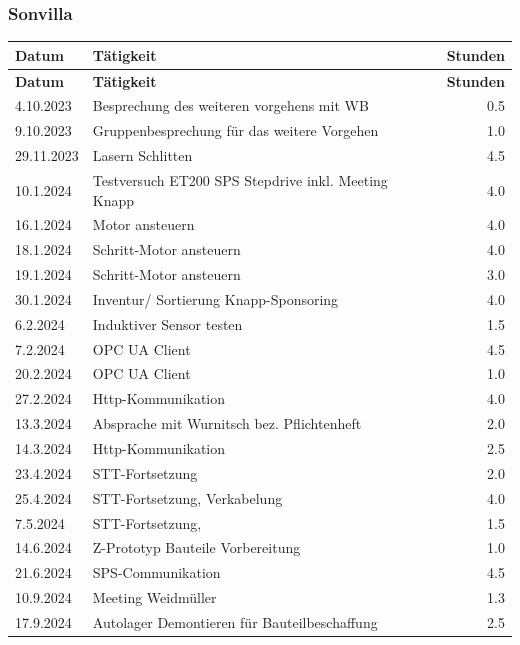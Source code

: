 \subsubsection{Sonvilla}
\begin{longtable}{|l|p{10cm}|r|}
    \hline
    \textbf{Datum} & \textbf{Tätigkeit} & \textbf{Stunden} \\
    \hline
    \endfirsthead

    \hline
    \textbf{Datum} & \textbf{Tätigkeit} & \textbf{Stunden} \\
    \hline
    \endhead

    \hline
    \endfoot

    \hline
    \endlastfoot

    4.10.2023	&	Besprechung des weiteren vorgehens mit WB	&	0.5 \\
    9.10.2023	&	Gruppenbesprechung für das weitere Vorgehen	&	1.0 \\
    29.11.2023	&	Lasern Schlitten	&	4.5 \\
    10.1.2024	&	Testversuch ET200 SPS Stepdrive inkl. Meeting Knapp	&	4.0 \\
    16.1.2024	&	Motor ansteuern	&	4.0 \\
    18.1.2024	&	Schritt-Motor ansteuern	&	4.0 \\
    19.1.2024	&	Schritt-Motor ansteuern	&	3.0 \\
    30.1.2024	&	Inventur/ Sortierung Knapp-Sponsoring	&	4.0 \\
    6.2.2024	&	Induktiver Sensor testen	&	1.5 \\
    7.2.2024	&	OPC UA Client	&	4.5 \\
    20.2.2024	&   OPC UA Client 	&	1.0 \\
    27.2.2024	&	Http-Kommunikation	&	4.0 \\
    13.3.2024	&	Absprache mit Wurnitsch bez. Pflichtenheft	&	2.0 \\
    14.3.2024	&	Http-Kommunikation	&	2.5 \\
    23.4.2024	&	STT-Fortsetzung 	&	2.0 \\
    25.4.2024	&	STT-Fortsetzung, Verkabelung	&	4.0 \\
    7.5.2024	&	STT-Fortsetzung,	&	1.5 \\
    14.6.2024	&	Z-Prototyp Bauteile Vorbereitung	&	1.0 \\
    21.6.2024	&	SPS-Communikation	&	4.5 \\
    10.9.2024	&	Meeting Weidmüller	&	1.3 \\
    17.9.2024	&	Autolager Demontieren für Bauteilbeschaffung	&	2.5 \\

\end{longtable}

